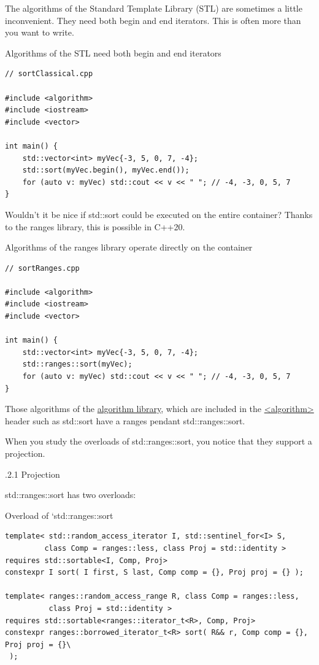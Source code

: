 
The algorithms of the Standard Template Library (STL) are sometimes a little inconvenient. They need both begin and end iterators. This is often more than you want to write.

\noindent
Algorithms of the STL need both begin and end iterators
\begin{lstlisting}[style=styleCXX]
// sortClassical.cpp

#include <algorithm>
#include <iostream>
#include <vector>

int main() {
	std::vector<int> myVec{-3, 5, 0, 7, -4};
	std::sort(myVec.begin(), myVec.end());
	for (auto v: myVec) std::cout << v << " "; // -4, -3, 0, 5, 7
}
\end{lstlisting}

Wouldn’t it be nice if std::sort could be executed on the entire container? Thanks to the ranges library, this is possible in C++20.

\noindent
Algorithms of the ranges library operate directly on the container
\begin{lstlisting}[style=styleCXX]
// sortRanges.cpp

#include <algorithm>
#include <iostream>
#include <vector>

int main() {
	std::vector<int> myVec{-3, 5, 0, 7, -4};
	std::ranges::sort(myVec);
	for (auto v: myVec) std::cout << v << " "; // -4, -3, 0, 5, 7
}
\end{lstlisting}

Those algorithms of the \href{https://en.cppreference.com/w/cpp/algorithm}{algorithm library}, which are included in the \href{https://en.cppreference.com/w/cpp/header/algorithm}{<algorithm>} header such as std::sort have a ranges pendant std::ranges::sort.

When you study the overloads of std::ranges::sort, you notice that they support a projection.

.2.1\hspace{0.2cm} Projection

std::ranges::sort has two overloads:

\noindent
Overload of ‘std::ranges::sort
\begin{lstlisting}[style=styleCXX]
template< std::random_access_iterator I, std::sentinel_for<I> S,
         class Comp = ranges::less, class Proj = std::identity >
requires std::sortable<I, Comp, Proj>
constexpr I sort( I first, S last, Comp comp = {}, Proj proj = {} );

template< ranges::random_access_range R, class Comp = ranges::less,
          class Proj = std::identity >
requires std::sortable<ranges::iterator_t<R>, Comp, Proj>
constexpr ranges::borrowed_iterator_t<R> sort( R&& r, Comp comp = {}, Proj proj = {}\
 );
\end{lstlisting}

